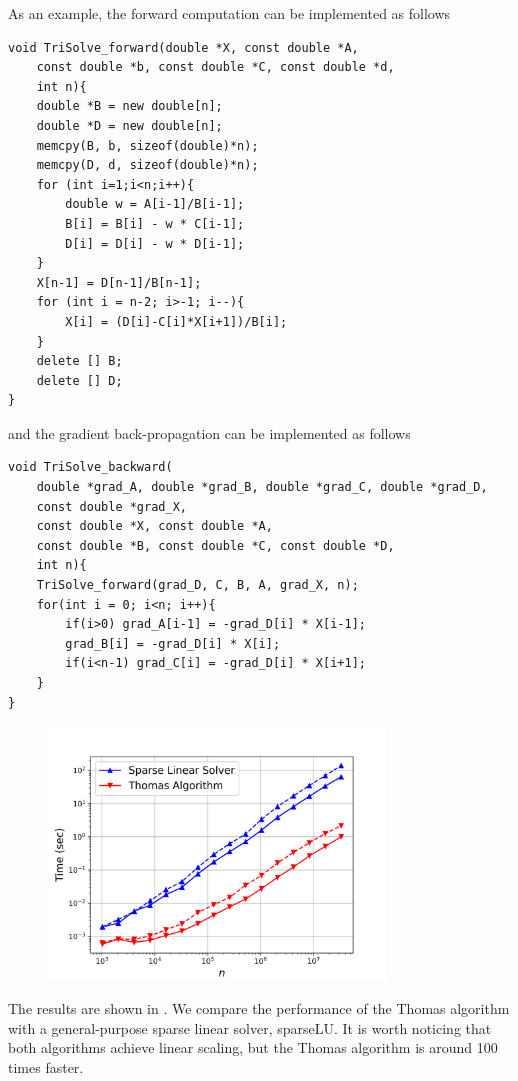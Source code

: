 \documentclass[3p,preprint,12pt]{elsarticle}
\begin{document}
As an example, the forward computation can be implemented as follows
\begin{verbatim}
void TriSolve_forward(double *X, const double *A, 
    const double *b, const double *C, const double *d,
    int n){
    double *B = new double[n]; 
    double *D = new double[n]; 
    memcpy(B, b, sizeof(double)*n);
    memcpy(D, d, sizeof(double)*n);
    for (int i=1;i<n;i++){
        double w = A[i-1]/B[i-1];
        B[i] = B[i] - w * C[i-1];
        D[i] = D[i] - w * D[i-1];
    }
    X[n-1] = D[n-1]/B[n-1];
    for (int i = n-2; i>-1; i--){
        X[i] = (D[i]-C[i]*X[i+1])/B[i];
    }
    delete [] B;
    delete [] D;
}
\end{verbatim}
and the gradient back-propagation can be implemented as follows
\begin{verbatim}
void TriSolve_backward(
    double *grad_A, double *grad_B, double *grad_C, double *grad_D,
    const double *grad_X,
    const double *X, const double *A, 
    const double *B, const double *C, const double *D,
    int n){
    TriSolve_forward(grad_D, C, B, A, grad_X, n);  
    for(int i = 0; i<n; i++){
        if(i>0) grad_A[i-1] = -grad_D[i] * X[i-1];
        grad_B[i] = -grad_D[i] * X[i];
        if(i<n-1) grad_C[i] = -grad_D[i] * X[i+1];
    }
}
\end{verbatim}

\begin{figure}[htpb]
    \centering
    \includegraphics[width=0.8\textwidth]{figures/trisolve.png}
    \caption{}
    \label{fig:trisolve}
\end{figure}

The results are shown in . We compare the performance of the Thomas algorithm with a general-purpose sparse linear solver, sparseLU. It is worth noticing that both algorithms achieve linear scaling, but the Thomas algorithm is around 100 times faster. 
\end{document}
